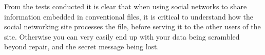 From the tests conducted it is clear that when using social networks to share information embedded in conventional files, it is critical to understand how the social networking site processes the file, before serving it to the other users of the site.
Otherwise you can very easily end up with your data being scrambled beyond repair, and the secret message being lost.